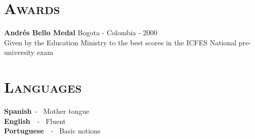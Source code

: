 \begin{resume}

\section{\textsc{Awards}}
\textbf{Andr\'{e}s Bello Medal} \hfill          Bogota - Colombia - 2000 \\
Given by the Education Ministry to the best scores in the ICFES National pre-university exam \hfill 

\section{\textsc{Languages}}
\textbf{Spanish}\   - \  Mother tongue \\
\textbf{English}\ \  - \ Fluent \\
\textbf{Portuguese}\ \  - \ Basic notions 


\end{resume}
